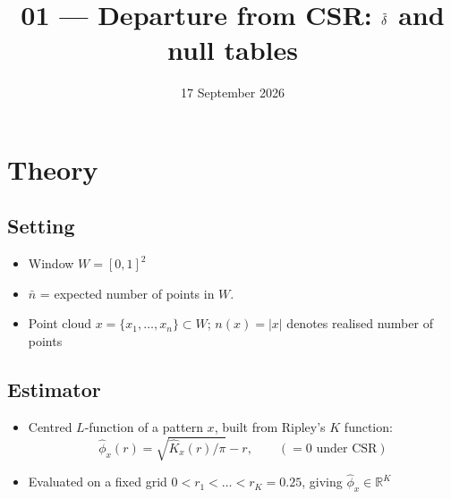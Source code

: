 \documentclass[11pt]{article}
\title{01 --- Departure from CSR: $\tilde\delta$ and null tables}
\date{17 September 2026}
\newcommand{\nb}{\bar n}
\newcommand{\R}{\mathbb R}
\begin{document}
\maketitle

\section{Theory}

\subsection*{Setting}
\begin{itemize}
  \item Window $W=[0,1]^2$
  \item $\nb$ = expected number of points in $W$.
  \item Point cloud $x = \{x_1,\dots,x_n\} \subset W$; $n(x) = |x|$ denotes realised number of points
\end{itemize}

\subsection*{Estimator}
\begin{itemize}
  \item Centred $L$-function of a pattern $x$, built from Ripley's $K$ function:
  \[
    \hat\phi_x(r) = \sqrt{\hat K_x(r)/\pi} - r,
    \qquad
    (= 0 \text{ under CSR})
  \]
  \item Evaluated on a fixed grid $0<r_1<\dots<r_K=0.25$, giving $\hat\phi_x \in \R^{K}$
\end{itemize}
\end{document}
